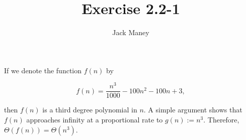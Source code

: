 \documentclass{article}
\begin{document}
\title{Exercise 2.2-1}
\author{Jack Maney}
\maketitle

If we denote the function $f(n)$ by

\[
	f(n) = \frac{n^3}{1000} - 100n^2 - 100n + 3,
\]

\noindent then $f(n)$ is a third degree polynomial in $n$. A simple argument shows that $f(n)$ approaches infinity at a proportional rate to $g(n) := n^3$. Therefore, $\Theta(f(n)) = \Theta(n^3)$.
\end{document}
